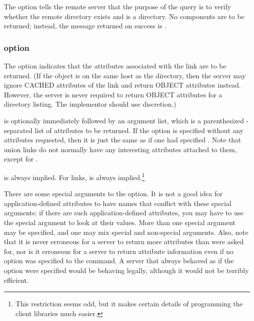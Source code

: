 The  option tells the remote server that the purpose of the
query is to verify whether the remote directory exists and is a
directory.  No components are to be returned; instead, the message
returned on success is .

\subsubsection{\protect{} option}

The  option indicates that the attributes associated
with the link are to be returned.  (If the object is on the same host
as the directory, then the server may ignore CACHED attributes of the link and
return OBJECT attributes instead.  However, the server is never
required to return OBJECT attributes for a directory listing.  The implementor
should use discretion.)


   is optionally immediately
followed by an argument list, which is a parenthesized \mbox{\lit{+}-se}para\-ted
list of attributes to be 
returned.  If the  option is specified without any
attributes requested, then it is just the same as if one had specified
.  Note that union links do not
normally have any interesting attributes attached to them, except
for .

 is always implied.  For 
links,  is always implied.\footnote{
	This restriction seems odd, but it makes certain details of
programming the client libraries much easier.} 

There are some special arguments to the
 option.  It is not a good idea for application-defined
attributes to have names that conflict with these special arguments; if
there are such application-defined attributes, you may have to use the
 special argument to look at their values.  More than one
special argument may be specified, and one may mix special and
non-special arguments.  Also, note that it is never erroneous
for a server to return more attributes
than were asked for, nor is it erroneous for a server to return
attribute information even if no  option was specified
to the  command.  A server that always behaved as if the
 option were specified would be behaving
legally, although it would not be terribly efficient. 

